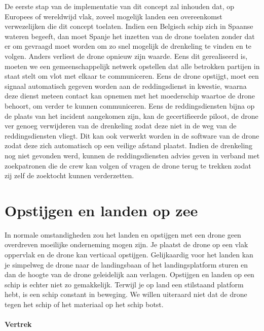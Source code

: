 De eerste stap van de implementatie van dit concept zal inhouden dat, op Europees of wereldwijd vlak, zoveel mogelijk landen een overeenkomst verwezelijken die dit concept toelaten. Indien een Belgisch schip zich in Spaanse wateren begeeft, dan moet Spanje het inzetten van de drone toelaten zonder dat er om gevraagd moet worden om zo snel mogelijk de drenkeling te vinden en te volgen. Anders verliest de drone opnieuw zijn waarde.
Eens dit gerealiseerd is, moeten we een gemeenschappelijk netwerk opstellen dat alle betrokken partijen in staat stelt om vlot met elkaar te communiceren. Eens de drone opstijgt, moet een signaal automatisch gegeven worden aan de reddingsdienst in kwestie, waarna deze dienst meteen contact kan opnemen met het moederschip waartoe de drone behoort, om verder te kunnen communiceren. Eens de reddingsdiensten bijna op de plaats van het incident aangekomen zijn, kan de gecertifieerde piloot, de drone ver genoeg verwijderen van de drenkeling zodat deze niet in de weg van de reddingsdiensten vliegt. Dit kan ook verwerkt worden in de software van de drone zodat deze zich automatisch op een veilige afstand plaatst. Indien de drenkeling nog niet gevonden werd, kunnen de reddingsdiensten advies geven in verband met zoekpatronen die de crew kan volgen of vragen de drone terug te trekken zodat zij zelf de zoektocht kunnen verderzetten.

\newpage

\section{Opstijgen en landen op zee}

In normale omstandigheden zou het landen en opstijgen met een drone geen overdreven moeilijke onderneming mogen zijn. Je plaatst de drone op een vlak oppervlak en de drone kan verticaal opstijgen. Gelijkaardig voor het landen kan je simpelweg de drone naar de landingsbaan of het landingsplatform sturen en dan de hoogte van de drone geleidelijk aan verlagen. Opstijgen en landen op een schip is echter niet zo gemakkelijk. Terwijl je op land een stilstaand platform hebt, is een schip constant in beweging. We willen uiteraard niet dat de drone tegen het schip of het materiaal op het schip botst. 

\paragraph{Vertrek}

